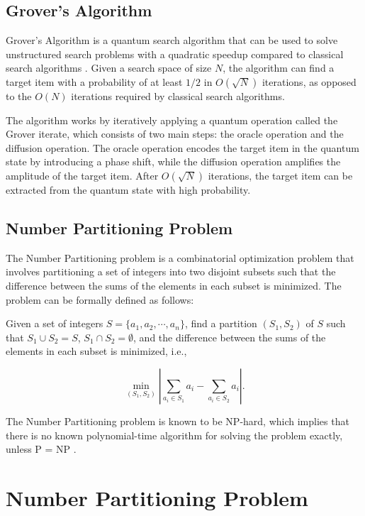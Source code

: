 \subsection{Grover's Algorithm}
Grover's Algorithm is a quantum search algorithm that can be used to solve unstructured search problems with a quadratic speedup compared to classical search algorithms \cite{grover1996fast}. Given a search space of size $N$, the algorithm can find a target item with a probability of at least $1/2$ in $O(\sqrt{N})$ iterations, as opposed to the $O(N)$ iterations required by classical search algorithms.

The algorithm works by iteratively applying a quantum operation called the Grover iterate, which consists of two main steps: the oracle operation and the diffusion operation. The oracle operation encodes the target item in the quantum state by introducing a phase shift, while the diffusion operation amplifies the amplitude of the target item. After $O(\sqrt{N})$ iterations, the target item can be extracted from the quantum state with high probability.

\subsection{Number Partitioning Problem}
The Number Partitioning problem is a combinatorial optimization problem that involves partitioning a set of integers into two disjoint subsets such that the difference between the sums of the elements in each subset is minimized. The problem can be formally defined as follows:

\begin{definition}
Given a set of integers $S = \{a_1, a_2, \cdots, a_n\}$, find a partition $(S_1, S_2)$ of $S$ such that $S_1 \cup S_2 = S$, $S_1 \cap S_2 = \emptyset$, and the difference between the sums of the elements in each subset is minimized, i.e.,

\begin{equation}
\min_{(S_1, S_2)} |\sum_{a_i \in S_1} a_i - \sum_{a_i \in S_2} a_i|.
\end{equation}
\end{definition}

The Number Partitioning problem is known to be NP-hard, which implies that there is no known polynomial-time algorithm for solving the problem exactly, unless P = NP \cite{garey1979computers}.

\section{Number Partitioning Problem}

